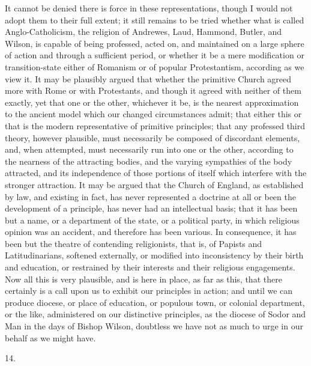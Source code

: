 It cannot be denied there is force in these representations, though
I would not adopt them to their full extent; it still remains to be
tried whether what is called Anglo-Catholicism, the religion of
Andrewes, Laud, Hammond, Butler, and Wilson, is capable of being
professed, acted on, and maintained on a large sphere of action and
through a sufficient period, or whether it be a mere modification or
transition-state either of Romanism or of popular Protestantism,
according as we view it. It may be plausibly argued that whether
the primitive Church agreed more with Rome or with Protestants, and
though it agreed with neither of them exactly, yet that one or the
other, whichever it be, is the nearest approximation to the ancient
model which our changed circumstances admit; that either this or that
is the modern representative of primitive principles; that any
professed third theory, however plausible, must necessarily be
composed of discordant elements, and, when attempted, must necessarily
run into one or the other, according to the nearness of the attracting
bodies, and the varying sympathies of the body attracted, and its
independence of those portions of itself which interfere with the
stronger attraction. It may be argued that the Church of England, as
established by law, and existing in fact, has never represented a
doctrine at all or been the development of a principle, has never had
an intellectual basis; that it has been but a name, or a department of
the state, or a political party, in which religious opinion was an
accident, and therefore has been various. In consequence, it has been
but the theatre of contending religionists, that is, of Papists and
Latitudinarians, softened externally, or modified into inconsistency
by their birth and education, or restrained by their interests and
their religious engagements. Now all this is very plausible, and is
here in place, as far as this, that there certainly is a call upon us
to exhibit our principles in action; and until we can produce diocese,
or place of education, or populous town, or colonial department, or
the like, administered on our distinctive principles, as the diocese
of Sodor and Man in the days of Bishop Wilson, doubtless we have not
as much to urge in our behalf as we might have.

14.

